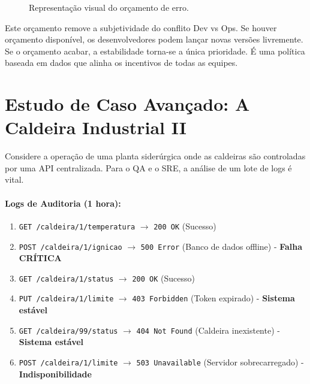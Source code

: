 \documentclass[12pt,a4paper,twoside]{report}
\begin{document}
\begin{figure}[h]
    \centering
    \caption{Representação visual do orçamento de erro.}
\end{figure}

Este orçamento remove a subjetividade do conflito Dev vs Ops. Se houver orçamento disponível, os desenvolvedores podem lançar novas versões livremente. Se o orçamento acabar, a estabilidade torna-se a única prioridade. É uma política baseada em dados que alinha os incentivos de todas as equipes.

\section{Estudo de Caso Avançado: A Caldeira Industrial II}

Considere a operação de uma planta siderúrgica onde as caldeiras são controladas por uma API centralizada. Para o QA e o SRE, a análise de um lote de logs é vital.

\paragraph{Logs de Auditoria (1 hora):}
\begin{enumerate}
    \item \texttt{GET /caldeira/1/temperatura} $\rightarrow$ \texttt{200 OK} (Sucesso)
    \item \texttt{POST /caldeira/1/ignicao} $\rightarrow$ \texttt{500 Error} (Banco de dados offline) - \textbf{Falha CRÍTICA}
    \item \texttt{GET /caldeira/1/status} $\rightarrow$ \texttt{200 OK} (Sucesso)
    \item \texttt{PUT /caldeira/1/limite} $\rightarrow$ \texttt{403 Forbidden} (Token expirado) - \textbf{Sistema estável}
    \item \texttt{GET /caldeira/99/status} $\rightarrow$ \texttt{404 Not Found} (Caldeira inexistente) - \textbf{Sistema estável}
    \item \texttt{POST /caldeira/1/limite} $\rightarrow$ \texttt{503 Unavailable} (Servidor sobrecarregado) - \textbf{Indisponibilidade}
\end{enumerate}
\end{document}
